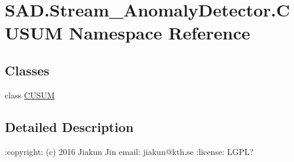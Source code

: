 \hypertarget{namespaceSAD_1_1Stream__AnomalyDetector_1_1CUSUM}{}\section{S\+A\+D.\+Stream\+\_\+\+Anomaly\+Detector.\+C\+U\+S\+UM Namespace Reference}
\label{namespaceSAD_1_1Stream__AnomalyDetector_1_1CUSUM}
\subsection*{Classes}
\begin{DoxyCompactItemize}
\item 
class \hyperlink{classSAD_1_1Stream__AnomalyDetector_1_1CUSUM_1_1CUSUM}{C\+U\+S\+UM}
\end{DoxyCompactItemize}


\subsection{Detailed Description}
\begin{DoxyVerb}:copyright: (c) 2016 Jiakun Jin
email: jiakun@kth.se
:license: LGPL?
\end{DoxyVerb}
 